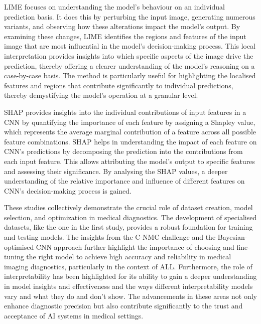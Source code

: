 \documentclass[
	a4paper,
	10pt,
	unnumberedsections,
	twoside,
]{research_article}
\begin{document}
LIME focuses on understanding the model's behaviour on an individual prediction basis. It does this by perturbing the input image, generating numerous variants, and observing how these alterations impact the model's output. By examining these changes, LIME identifies the regions and features of the input image that are most influential in the model's decision-making process. This local interpretation provides insights into which specific aspects of the image drive the prediction, thereby offering a clearer understanding of the model's reasoning on a case-by-case basis. The method is particularly useful for highlighting the localised features and regions that contribute significantly to individual predictions, thereby demystifying the model's operation at a granular level.

SHAP provides insights into the individual contributions of input features in a CNN by quantifying the importance of each feature by assigning a Shapley value, which represents the average marginal contribution of a feature across all possible feature combinations. SHAP helps in understanding the impact of each feature on CNN's predictions by decomposing the prediction into the contributions from each input feature. This allows attributing the model's output to specific features and assessing their significance. By analysing the SHAP values, a deeper understanding of the relative importance and influence of different features on CNN's decision-making process is gained. 

These studies collectively demonstrate the crucial role of dataset creation, model selection, and optimization in medical diagnostics. The development of specialised datasets, like the one in the first study, provides a robust foundation for training and testing models. The insights from the C-NMC challenge and the Bayesian-optimised CNN approach further highlight the importance of choosing and fine-tuning the right model to achieve high accuracy and reliability in medical imaging diagnostics, particularly in the context of ALL. Furthermore, the role of interpretability has been highlighted for its ability to gain a deeper understanding in model insights and effectiveness and the ways different interpretability models vary and what they do and don't show. The advancements in these areas not only enhance diagnostic precision but also contribute significantly to the trust and acceptance of AI systems in medical settings.

\end{document}
